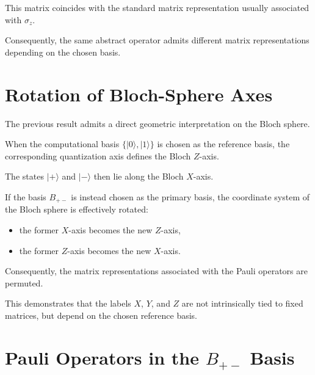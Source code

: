 This matrix coincides with the standard matrix representation usually associated with \( \sigma_z \).

\medskip

Consequently, the same abstract operator admits different matrix representations depending on the chosen basis.


\section*{Rotation of Bloch-Sphere Axes}

The previous result admits a direct geometric interpretation on the Bloch sphere.

When the computational basis \( \{|0\rangle,|1\rangle\} \) is chosen as the reference basis, the corresponding quantization axis defines the Bloch \(Z\)-axis.

The states \( |+\rangle \) and \( |-\rangle \) then lie along the Bloch \(X\)-axis.

\medskip

If the basis \( B_{+-} \) is instead chosen as the primary basis, the coordinate system of the Bloch sphere is effectively rotated:

\begin{itemize}

\item the former \(X\)-axis becomes the new \(Z\)-axis,

\item the former \(Z\)-axis becomes the new \(X\)-axis.

\end{itemize}

Consequently, the matrix representations associated with the Pauli operators are permuted.

\medskip

This demonstrates that the labels \(X\), \(Y\), and \(Z\) are not intrinsically tied to fixed matrices, but depend on the chosen reference basis.


\section*{Pauli Operators in the \(B_{+-}\) Basis}

